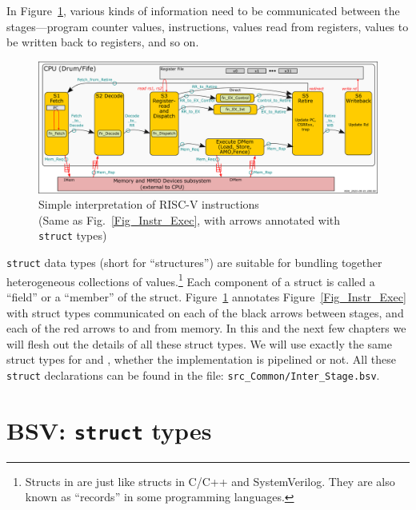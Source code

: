 In Figure~\ref{Fig_Simple_Instr_Exec_w_structs}, various kinds of
information need to be communicated between the stages---program
counter values, instructions, values read from registers, values to be
written back to registers, and so on.
\begin{figure}[htbp]
  \centerline{\includegraphics[width=6in,angle=0]{Figures/RSN_2025-09-01.000.00_FifeDrum_Stages_Multilayer_L1_L3}}
  \caption{\label{Fig_Simple_Instr_Exec_w_structs}
           Simple interpretation of RISC-V instructions \\
	   \hmmmm\hmm (Same as Fig.~\ref{Fig_Instr_Exec}, with arrows annotated with {\tt struct} types)}
\end{figure}
\verb|struct| data types (short for ``structures'') are suitable for
bundling together heterogeneous collections of
values.\footnote{Structs in {\BSV} are just like structs in C/C++ and
SystemVerilog.  They are also known as ``records'' in some programming
languages.}  Each component of a struct is called a ``field'' or a
``member'' of the struct.
Figure~\ref{Fig_Simple_Instr_Exec_w_structs} annotates
Figure~\ref{Fig_Instr_Exec} with struct types communicated on each of
the black arrows between stages, and each of the red arrows to and
from memory.  In this and the next few chapters we will flesh out the
details of all these struct types.  We will use exactly the same
struct types for {\FIFE} and {\DRUM}, {\ie} whether the implementation is
pipelined or not.  All these \verb|struct| declarations can be found
in the file: \verb|src_Common/Inter_Stage.bsv|.


\section{BSV: {\tt struct} types}

\label{BSV_struct_types}
\label{Sec_Mem_Req}

